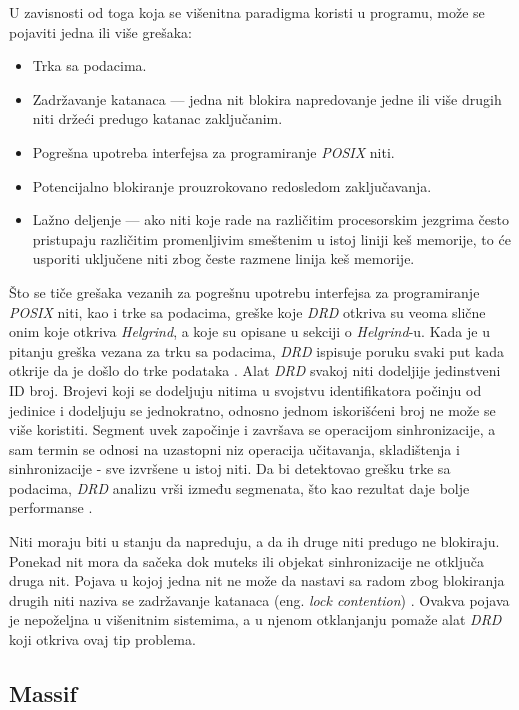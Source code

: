 \documentclass[12pt,oneside]{memoir}
\theoremstyle{plain}
\theoremstyle{definition}
\begin{document}
U zavisnosti od toga koja se višenitna paradigma koristi u programu, može se pojaviti jedna ili više grešaka:
\begin{itemize}
\item Trka sa podacima.
\item Zadržavanje katanaca --- jedna nit blokira napredovanje jedne ili više drugih niti držeći predugo katanac zaključanim.
\item Pogrešna upotreba interfejsa za programiranje \textit{POSIX} niti.
\item Potencijalno blokiranje prouzrokovano redosledom zaključavanja.
\item Lažno deljenje --- ako niti koje rade na različitim procesorskim jezgrima često pristupaju različitim promenljivim smeštenim u istoj liniji keš memorije, to će usporiti uključene niti zbog česte razmene linija keš memorije.
\end{itemize} 

Što se tiče grešaka vezanih za pogrešnu upotrebu interfejsa za programiranje \textit{POSIX} niti, kao i trke sa podacima, greške koje \textit{DRD} otkriva su veoma slične onim koje otkriva \textit{Helgrind}, a koje su opisane u sekciji o \textit{Helgrind}-u. Kada je u pitanju greška vezana za trku sa podacima, \textit{DRD} ispisuje poruku svaki put kada otkrije da je došlo do trke podataka \cite{Drd}. Alat \textit{DRD} svakoj niti dodeljije jedinstveni ID broj. Brojevi koji se dodeljuju nitima u svojstvu identifikatora počinju od jedinice i dodeljuju se jednokratno, odnosno jednom iskorišćeni broj ne može se više koristiti. Segment uvek započinje i završava se operacijom sinhronizacije, a sam termin se odnosi na uzastopni niz operacija učitavanja, skladištenja i sinhronizacije - sve izvršene u istoj niti. Da bi detektovao grešku trke sa podacima, \textit{DRD} analizu vrši između segmenata, što kao rezultat daje bolje performanse \cite{Drd}.

Niti moraju biti u stanju da napreduju, a da ih druge niti predugo ne blokiraju. Ponekad nit mora da sačeka dok muteks ili objekat sinhronizacije ne otključa druga nit. Pojava u kojoj jedna nit ne može da nastavi sa radom zbog blokiranja drugih niti naziva se zadržavanje katanaca (eng. \textit{lock contention})  \cite{Drd}. Ovakva pojava je nepoželjna u višenitnim sistemima, a u njenom otklanjanju pomaže alat \textit{DRD} koji otkriva ovaj tip problema. 

\subsection{Massif}
\end{document}
